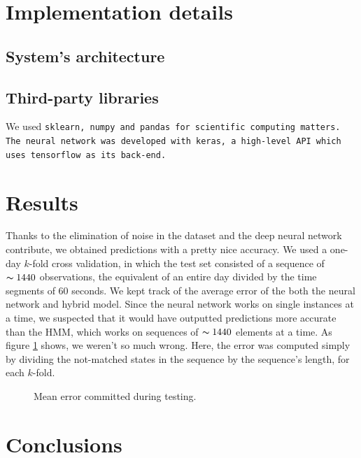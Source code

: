\documentclass[10pt,a4paper]{article}
\begin{document}
\section{Implementation details}
\subsection{System's architecture}
\subsection{Third-party libraries}
We used \tt sklearn\rm, \tt numpy \rm and \tt pandas \rm for scientific computing matters. The neural network was developed with \tt keras\rm, a high-level API which uses \tt tensorflow \rm as its back-end. 
\section{Results}
Thanks to the elimination of noise in the dataset and the deep neural network contribute, we obtained predictions with a pretty nice accuracy. We used a one-day $k$-fold cross validation, in which the test set consisted of a sequence of $\thicksim 1440$ observations, the equivalent of an entire day divided by the time segments of $60$ seconds. We kept track of the average error of the both the neural network and hybrid model. Since the neural network works on single instances at a time, we suspected that it would have outputted predictions more accurate than the HMM, which works on sequences of $\thicksim 1440$ elements at a time. As figure \ref{figure:err_graph} shows, we weren't so much wrong. Here, the error was computed simply by dividing the not-matched states in the sequence by the sequence's length, for each $k$-fold.

\begin{figure}
	\centering
	\caption{Mean error committed during testing.}
	\label{figure:err_graph}
\end{figure}
\section{Conclusions}
\end{document}
